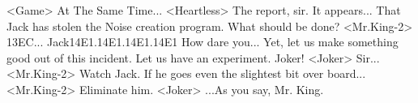 <Game> At The Same Time... 
<Heartless> The report, sir. 
It appears... 
That Jack has stolen the Noise creation program. 
What should be done? 
<Mr.King-2> {13}{EC}... 
Jack{14}{E1}.{14}{E1}.{14}{E1}.{14}{E1} How dare you... 
Yet, let us make something good out of this incident. 
Let us have an experiment. 
Joker! 
<Joker> Sir... 
<Mr.King-2> Watch Jack. 
If he goes even the slightest bit over board... 
<Mr.King-2> Eliminate him. 
<Joker> ...As you say, Mr. King. 

